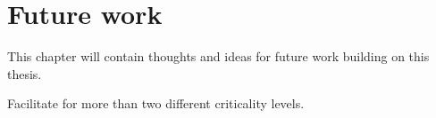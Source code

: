\chapter{Future work}
This chapter will contain thoughts and ideas for future work building on this thesis.

Facilitate for more than two different criticality levels.
